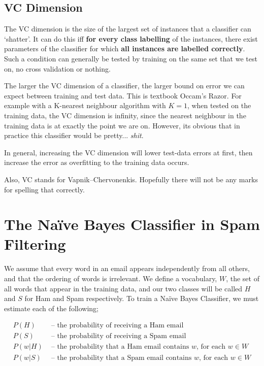 \documentclass{article}
\begin{document}
    \subsection{VC Dimension}
        The VC dimension is the size of the largest set of instances that a classifier can `shatter'. It can do this iff \textbf{for every class labelling} of the instances, there exist parameters of the classifier for which \textbf{all instances are labelled correctly}.
        Such a condition can generally be tested by training on the same set that we test on, no cross validation or nothing. 
        
        The larger the VC dimension of a classifier, the larger bound on error we can expect between training and test data. This is textbook Occam's Razor. For example with a K-nearest neighbour algorithm with $K=1$, when tested on the training data, the VC dimension is infinity, since the nearest neighbour in the training data is at exactly the point we are on. However, its obvious that in practice this classifier would be pretty... \emph{shit}.
        
        In general, increasing the VC dimension will lower test-data errors at first, then increase the error as overfitting to the training data occurs.
        
        Also, VC stands for Vapnik–Chervonenkis. Hopefully there will not be any marks for spelling that correctly.
            
\section{The Na\"{i}ve Bayes Classifier in Spam Filtering}

    We assume that every word in an email appears independently from all others, and that the ordering of words is irrelevant. We define a vocabulary, $W$, the set of all words that appear in the training data, and our two classes will be called $H$ and $S$ for Ham and Spam respectively. To train a Na\"{i}ve Bayes Classifier, we must estimate each of the following;
    
    \begin{align*}
        P(H) &\mbox{ -- the probability of receiving a Ham email}\\
        P(S) &\mbox{ -- the probability of receiving a Spam email}\\
        P(w | H) &\mbox{ -- the probability that a Ham email contains $w$, for each $w \in W$}\\
        P(w | S) &\mbox{ -- the probability that a Spam email contains $w$, for each $w \in W$}
    \end{align*}
\end{document}
